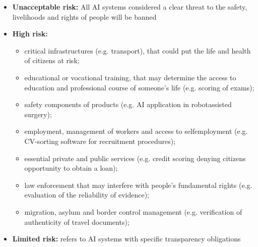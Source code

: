 \begin{itemize}
    \item \textbf{Unacceptable risk:} All AI systems considered a clear threat to the safety, livelihoods and rights of people will be banned
    \item \textbf{High risk:} \begin{itemize}
        \item critical infrastructures (e.g. transport), that could put the life and health of citizens at risk;
        \item educational or vocational training, that may determine the access to education and professional course of someone’s life (e.g. scoring of exams);
        \item safety components of products (e.g. AI application in robotassisted surgery);
        \item employment, management of workers and access to selfemployment (e.g. CV-sorting software for recruitment procedures);
        \item essential private and public services (e.g. credit scoring denying citizens opportunity to obtain a loan);
        \item law enforcement that may interfere with people’s fundamental rights (e.g. evaluation of the reliability of evidence);
        \item migration, asylum and border control management (e.g. verification of authenticity of travel documents);
    \end{itemize}
    \item \textbf{Limited risk:} refers to AI systems with specific transparency obligations
\end{itemize}
